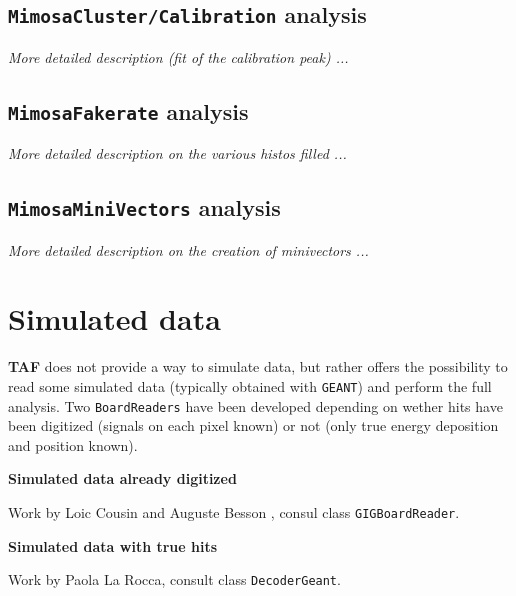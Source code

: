 \documentclass[a4paper, 12pt, twoside]{article}
\newcommand{\TAF}{{\bf TAF }}
\begin{document}
\subsection{{\tt MimosaCluster/Calibration} analysis}

{\it More detailed description (fit of the calibration peak) ...}

\subsection{{\tt MimosaFakerate} analysis}

{\it More detailed description on the various histos filled ...}

\subsection{{\tt MimosaMiniVectors} analysis}

{\it More detailed description on the creation of minivectors ...}


\vspace{2cm}

\section{Simulated data}
\label{secSimulation}

\noindent
\TAF does not provide a way to simulate data, but rather offers the possibility to read some simulated data (typically obtained with {\tt GEANT}) and perform the full analysis. Two {\tt BoardReaders} have been developed depending on wether hits have been digitized (signals on each pixel known) or not (only true energy deposition and position known).\\


\vspace{0.8 cm}

\noindent
{\bf Simulated data already digitized}

\noindent
Work by Loic Cousin and Auguste Besson , consul class {\tt GIGBoardReader}.
\\


\vspace{0.8 cm}

\noindent
{\bf Simulated data with true hits}

\noindent
Work by Paola  La Rocca, consult class {\tt DecoderGeant}.
\\
\end{document}

